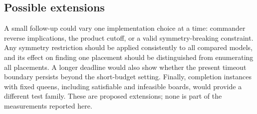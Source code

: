 \subsection*{Possible extensions}
A small follow-up could vary one implementation choice at a time:
commander reverse implications, the product cutoff, or a valid
symmetry-breaking constraint. Any symmetry restriction should be applied
consistently to all compared models, and its effect on finding one
placement should be distinguished from enumerating all placements.
A longer deadline would also show whether the present timeout boundary
persists beyond the short-budget setting. Finally, completion instances
with fixed queens, including satisfiable and infeasible boards, would
provide a different test family. These are proposed extensions; none is
part of the measurements reported here.
